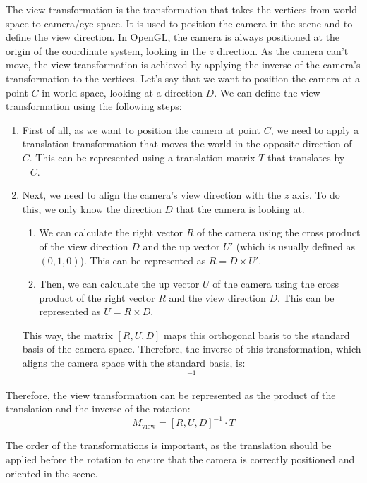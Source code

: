 The view transformation is the transformation that takes the vertices from world space to camera/eye space. It is used to position the camera in the scene and to define the view direction. In OpenGL, the camera is always positioned at the origin of the coordinate system, looking in the $z$ direction. As the camera can't move, the view transformation is achieved by applying the inverse of the camera's transformation to the vertices.
Let's say that we want to position the camera at a point $C$ in world space, looking at a direction $D$. We can define the view transformation using the following steps:
\begin{enumerate}
    \item First of all, as we want to position the camera at point $C$, we need to apply a translation transformation that moves the world in the opposite direction of $C$. This can be represented using a translation matrix $T$ that translates by $-C$.
    \item Next, we need to align the camera's view direction with the $z$ axis. To do this, we only know the direction $D$ that the camera is looking at.
    \begin{enumerate}
        \item We can calculate the right vector $R$ of the camera using the cross product of the view direction $D$ and the up vector $U'$ (which is usually defined as $(0, 1, 0)$). This can be represented as $R = D \times U'$.
        \item Then, we can calculate the up vector $U$ of the camera using the cross product of the right vector $R$ and the view direction $D$. This can be represented as $U = R \times D$.
    \end{enumerate}

    This way, the matrix $[R, U, D]$ maps this orthogonal basis to the standard basis of the camera space. Therefore, the inverse of this transformation, which aligns the camera space with the standard basis, is:
    \begin{equation*}
        [R, U, D]^{-1}
    \end{equation*}
\end{enumerate}

Therefore, the view transformation can be represented as the product of the translation and the inverse of the rotation:
\begin{equation*}
    M_{\text{view}} = [R, U, D]^{-1} \cdot T
\end{equation*}

The order of the transformations is important, as the translation should be applied before the rotation to ensure that the camera is correctly positioned and oriented in the scene.

